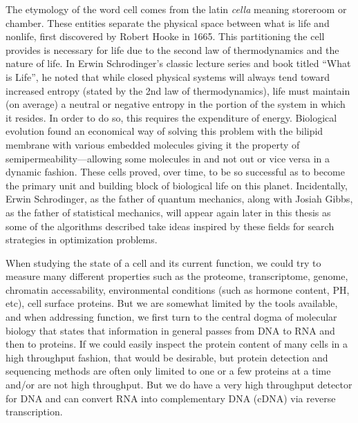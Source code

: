 \par{
The etymology of the word cell comes from the latin \textit{cella} meaning storeroom or chamber. These entities separate the physical space between what is life and nonlife, first discovered by Robert Hooke in 1665\cite{Hooke}. This partitioning the cell provides is necessary for life due to the second law of thermodynamics and the nature of life. In Erwin Schrodinger's classic lecture series and book titled ``What is Life''\cite{whatislife}, he noted that while closed physical systems will always tend toward increased entropy (stated by the 2nd law of thermodynamics\cite{thermodynamics1}\cite{thermodynamics2}\cite{maxwell}), life must maintain (on average) a neutral or negative entropy in the portion of the system in which it resides\cite{informationtheorylife}\cite{astrobiology}\cite{extremalities}. In order to do so, this requires the expenditure of energy. Biological evolution found an economical way of solving this problem with the bilipid membrane with various embedded molecules giving it the property of semipermeability---allowing some molecules in and not out or vice versa in a dynamic fashion. These cells proved, over time, to be so successful as to become the primary unit and building block of biological life on this planet. Incidentally, Erwin Schrodinger, as the father of quantum mechanics, along with Josiah Gibbs, as the father of statistical mechanics, will appear again later in this thesis as some of the algorithms described take ideas inspired by these fields for search strategies in optimization problems.
} 

\par{
When studying the state of a cell and its current function, we could try to measure many different properties such as the proteome, transcriptome, genome, chromatin accessability, environmental conditions (such as hormone content, PH, etc), cell surface proteins. But we are somewhat limited by the tools available, and when addressing function, we first turn to the central dogma of molecular biology\cite{centraldogma} that states that information in general passes from DNA to RNA and then to proteins. If we could easily inspect the protein content of many cells in a high throughput fashion, that would be desirable, but protein detection and sequencing methods are often only limited to one or a few proteins at a time and/or are not high throughput\cite{immunohistochemistry}\cite{multiIHC}\cite{westernblot}\cite{western2}\cite{multimassspec}\cite{ionbeam}\cite{cellIHC}\cite{proteinsequencing}. But we do have a very high throughput detector for DNA and can convert RNA into complementary DNA (cDNA) via reverse transcription.
}

